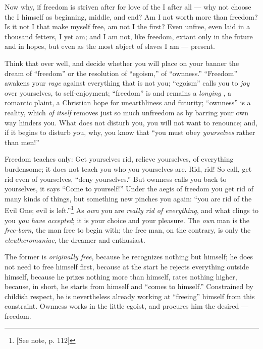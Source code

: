 Now why, if freedom is striven after for love of the I after all --- why not 
choose the I himself as beginning, middle, and end? Am I not worth more than 
freedom? Is it not I that make myself free, am not I the first? Even unfree, 
even laid in a thousand fetters, I yet am; and I am not, like freedom, extant 
only in the future and in hopes, but even as the most abject of slaves I am --- 
present.

Think that over well, and decide whether you will place on your banner the 
dream of ``freedom'' or the resolution of ``egoism,'' of ``ownness.'' 
``Freedom'' awakens your \textit{rage} against everything that is not you; 
``egoism'' calls you to \textit{joy} over yourselves, to self-enjoyment; 
``freedom'' is and remains a \textit{longing} , a romantic plaint, a 
Christian hope for unearthliness and futurity; ``ownness'' is a reality, 
which \textit{of itself} removes just so much unfreedom as by barring your own 
way hinders you. What does not disturb you, you will not want to renounce; 
and, if it begins to disturb you, why, you know that ``you must obey 
\textit{yourselves} rather than men!''

Freedom teaches only: Get yourselves rid, relieve yourselves, of everything 
burdensome; it does not teach you who you yourselves are. Rid, rid! So call, 
get rid even of yourselves, ``deny yourselves.'' But ownness calls you back 
to yourselves, it says ``Come to yourself!'' Under the aegis of freedom you 
get rid of many kinds of things, but something new pinches you again: ``you 
are rid of the Evil One; evil is left.''\footnote{[See note, p. 112]} As 
\textit{own} you are \textit{really rid of everything}, and what clings to you 
\textit{you have accepted}; it is your choice and your pleasure. The 
\textit{own} man is the \textit{free-born}, the man free to begin with; the 
free man, on the contrary, is only the \textit{eleutheromaniac}, the dreamer 
and enthusiast.

The former is \textit{originally free}, because he recognizes nothing but 
himself; he does not need to free himself first, because at the start he 
rejects everything outside himself, because he prizes nothing more than 
himself, rates nothing higher, because, in short, he starts from himself and 
``comes to himself.'' Constrained by childish respect, he is nevertheless 
already working at ``freeing'' himself from this constraint. Ownness works 
in the little egoist, and procures him the desired --- freedom.

